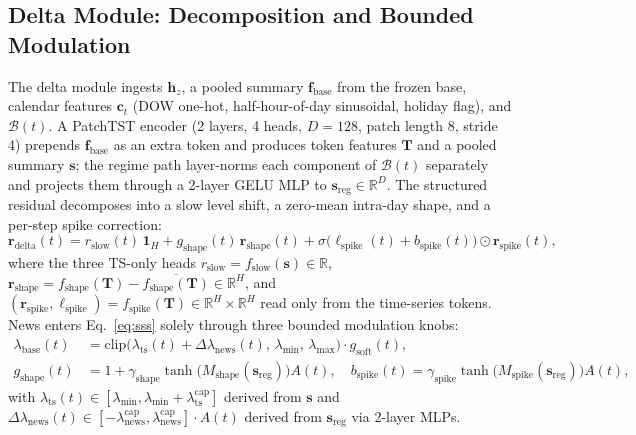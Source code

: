 \documentclass{article}
\begin{document}
\subsection{Delta Module: Decomposition and Bounded Modulation}
\label{sec:delta-module}

The delta module ingests $\bm{h}_z$, a pooled summary $\bm{f}_{\text{base}}$ from the frozen base, calendar features $\bm{c}_t$ (DOW one-hot, half-hour-of-day sinusoidal, holiday flag), and $\mathcal{B}(t)$.
A PatchTST encoder (2 layers, 4 heads, $D{=}128$, patch length 8, stride 4) prepends $\bm{f}_{\text{base}}$ as an extra token and produces token features $\bm{T}$ and a pooled summary $\bm{s}$; the regime path layer-norms each component of $\mathcal{B}(t)$ separately and projects them through a 2-layer GELU MLP to $\bm{s}_{\text{reg}}\in\mathbb{R}^D$.
The structured residual decomposes into a slow level shift, a zero-mean intra-day shape, and a per-step spike correction:
\begin{equation}
    \bm{r}_{\text{delta}}(t) = r_{\text{slow}}(t)\,\bm{1}_H + g_{\text{shape}}(t)\,\bm{r}_{\text{shape}}(t) + \sigma\!\bigl(\bm{\ell}_{\text{spike}}(t)+b_{\text{spike}}(t)\bigr)\odot\bm{r}_{\text{spike}}(t),
    \label{eq:sss}
\end{equation}
where the three TS-only heads $r_{\text{slow}}{=}f_{\text{slow}}(\bm{s})\in\mathbb{R}$, $\bm{r}_{\text{shape}}{=}f_{\text{shape}}(\bm{T})\!-\!\overline{f_{\text{shape}}(\bm{T})}\in\mathbb{R}^H$, and $(\bm{r}_{\text{spike}},\bm{\ell}_{\text{spike}}){=}f_{\text{spike}}(\bm{T})\in\mathbb{R}^H\!\times\!\mathbb{R}^H$ read only from the time-series tokens.
News enters Eq.~\ref{eq:sss} solely through three bounded modulation knobs:
\begin{equation}
\begin{aligned}
    \lambda_{\text{base}}(t) &= \mathrm{clip}\!\bigl(\lambda_{\text{ts}}(t)+\Delta\lambda_{\text{news}}(t),\,\lambda_{\min},\,\lambda_{\max}\bigr)\cdot g_{\text{soft}}(t),\\
    g_{\text{shape}}(t) &= 1+\gamma_{\text{shape}}\tanh\!\bigl(M_{\text{shape}}(\bm{s}_{\text{reg}})\bigr)A(t), \quad
    b_{\text{spike}}(t) = \gamma_{\text{spike}}\tanh\!\bigl(M_{\text{spike}}(\bm{s}_{\text{reg}})\bigr)A(t),
\end{aligned}
\label{eq:knobs}
\end{equation}
with $\lambda_{\text{ts}}(t)\in[\lambda_{\min},\lambda_{\min}{+}\lambda_{\text{ts}}^{\text{cap}}]$ derived from $\bm{s}$ and $\Delta\lambda_{\text{news}}(t)\in[-\lambda_{\text{news}}^{\text{cap}},\lambda_{\text{news}}^{\text{cap}}]\!\cdot\!A(t)$ derived from $\bm{s}_{\text{reg}}$ via 2-layer MLPs.
\end{document}
